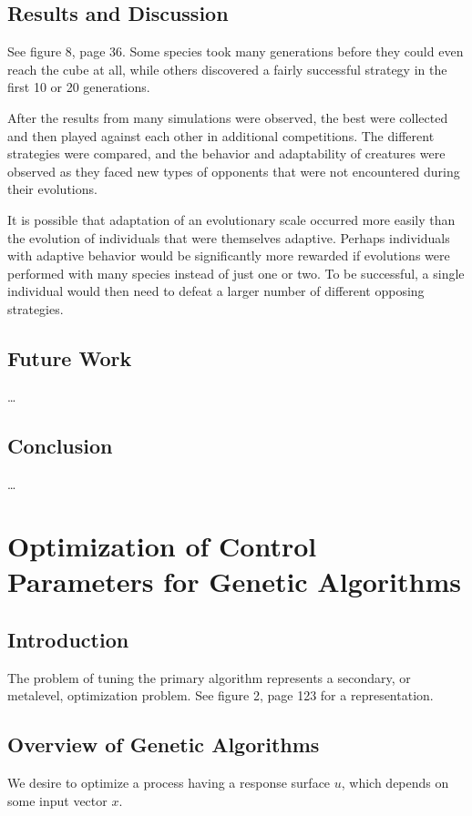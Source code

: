 \documentclass[12pt]{article}
\begin{document}
\subsection{Results and Discussion}
See figure 8, page 36. Some species took many generations before they could even reach the cube at all, while others discovered a fairly successful strategy in the first 10 or 20 generations.

After the results from many simulations were observed, the best were collected and then played against each other in additional competitions. The different strategies were compared, and the behavior and adaptability of creatures were observed as they faced new types of opponents that were not encountered during their evolutions.

It is possible that adaptation of an evolutionary scale occurred more easily than the evolution of individuals that were themselves adaptive. Perhaps individuals with adaptive behavior would be significantly more rewarded if evolutions were performed with many species instead of just one or two. To be successful, a single individual would then need to defeat a larger number of different opposing strategies.

\subsection{Future Work}
\dots

\subsection{Conclusion}
\dots
\clearpage

\section{Optimization of Control Parameters for Genetic Algorithms}
\subsection{Introduction}
The problem of tuning the primary algorithm represents a secondary, or metalevel, optimization problem. See figure 2, page 123 for a representation.

\subsection{Overview of Genetic Algorithms}
We desire to optimize a process having a response surface $u$, which depends on some input vector $x$.
\end{document}
